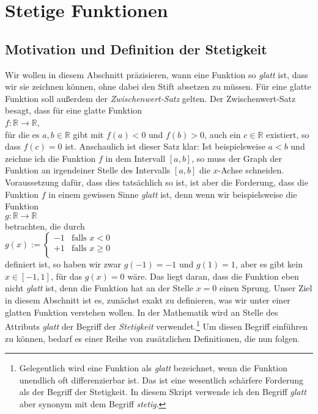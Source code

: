 \chapter{Stetige  Funktionen}
\section{Motivation und Definition der Stetigkeit}
Wir wollen in diesem Abschnitt pr\"azisieren, wann eine Funktion so \emph{glatt} ist, dass
wir sie zeichnen k\"onnen, ohne dabei den Stift absetzen zu m\"ussen.  F\"ur eine glatte Funktion soll au{\ss}erdem der
\emph{Zwischenwert-Satz} gelten.  Der Zwischenwert-Satz besagt, dass f\"ur eine glatte Funktion
\\[0.2cm]
\hspace*{1.3cm}
$f: \mathbb{R} \rightarrow \mathbb{R}$,
\\[0.2cm]
f\"ur die es $a,b \in \mathbb{R}$ gibt mit $f(a) < 0$ und $f(b) > 0$, auch ein $c \in \mathbb{R}$
existiert, so dass $f(c) = 0$ ist.  Anschaulich ist dieser Satz klar:  Ist beispielsweise $a < b$ und
zeichne ich die Funktion $f$ in dem Intervall $[a, b]$, so muss der Graph der Funktion an irgendeiner
Stelle des Intervalls $[a,b]$ die $x$-Achse schneiden.  Voraussetzung daf\"ur, dass dies tats\"achlich so
ist, ist aber die Forderung, dass die Funktion $f$ in einem gewissen Sinne \emph{glatt} ist, denn wenn wir
beispielsweise die Funktion 
\\[0.2cm]
\hspace*{1.3cm}
$g: \mathbb{R} \rightarrow \mathbb{R}$
\\[0.2cm]
betrachten, die durch 
\\[0.2cm]
\hspace*{1.3cm}
$g(x) := \left\{
 \begin{array}{ll}
 -1 & \mbox{falls $x <    0$} \\ 
 +1 & \mbox{falls $x \geq 0$} \\ 
 \end{array}
 \right.
$
\\[0.2cm]
definiert ist, so haben wir zwar  $g(-1) = -1$ und $g(1) = 1$, aber es gibt kein $x \in [-1,1]$, 
f\"ur das $g(x) = 0$ w\"are.   Das liegt daran, dass die Funktion eben nicht \emph{glatt} ist, denn die
Funktion hat an der Stelle $x = 0$ einen Sprung.  Unser Ziel in diesem Abschnitt ist es, zun\"achst exakt zu
definieren, was wir unter einer glatten Funktion verstehen wollen.  In der Mathematik wird an Stelle des
Attributs \emph{glatt} der Begriff der \emph{Stetigkeit} verwendet.\footnote{
Gelegentlich wird eine Funktion  als \emph{glatt} bezeichnet, wenn die Funktion unendlich oft
differenzierbar ist.  Das ist eine wesentlich sch\"arfere Forderung als der Begriff der Stetigkeit.
In diesem Skript verwende ich den Begriff \emph{glatt} aber synonym mit dem Begriff \emph{stetig}.}
Um diesen Begriff einf\"uhren zu k\"onnen,
bedarf es einer Reihe von zus\"atzlichen Definitionen, die nun folgen.


